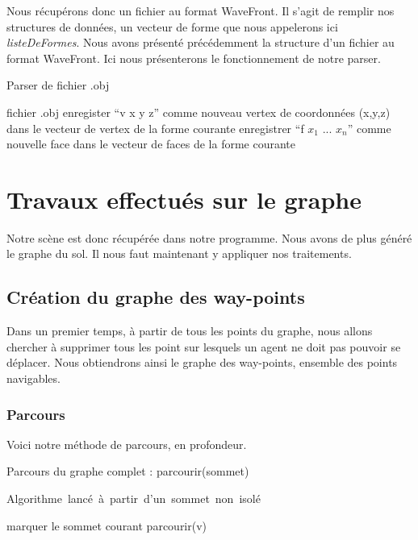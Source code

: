 \documentclass[a4paper,12pt]{report}
\begin{document}
Nous récupérons donc un fichier au format WaveFront. Il s'agit de remplir nos structures de données, un vecteur de forme que nous appelerons ici \textit{listeDeFormes}.
Nous avons présenté précédemment la structure d'un fichier au format WaveFront. Ici nous présenterons le fonctionnement de notre parser.

\begin{algorithm}[h]
\caption{Parser de fichier .obj}
\label{parser}
\begin{algorithmic}[1]
\REQUIRE fichier .obj
    \STATE enregister ``v x y z'' comme nouveau vertex de coordonnées (x,y,z) dans le vecteur de vertex de la forme courante
  \ELSE
    \STATE enregistrer ``f $x_{1}$ ... $x_{n}$'' comme nouvelle face dans le vecteur de faces de la forme courante
    \ENDIF
  \ENDIF
\ENDFOR
\end{algorithmic}
\end{algorithm}
 

\section{Travaux effectués sur le graphe}

Notre scène est donc récupérée dans notre programme. Nous avons de plus généré le graphe du sol. Il nous faut maintenant y appliquer nos traitements.

\subsection{Création du graphe des way-points}

Dans un premier temps, à partir de tous les points du graphe, nous allons chercher à supprimer tous les point sur lesquels un agent ne doit pas pouvoir se déplacer. Nous obtiendrons ainsi le graphe des way-points, ensemble des points navigables.

\subsubsection{Parcours}

Voici notre méthode de parcours, en profondeur. 

\begin{algorithm}[h]
\caption{Parcours du graphe complet : parcourir(sommet)}
\label{parcours_graphe}
\mbox{Algorithme lancé à partir d'un sommet non isolé}
\begin{algorithmic}[1]
  \STATE marquer le sommet courant
    \STATE parcourir(v)
  \ENDFOR
\ENDIF
\end{algorithmic}
\end{algorithm}
\end{document}

